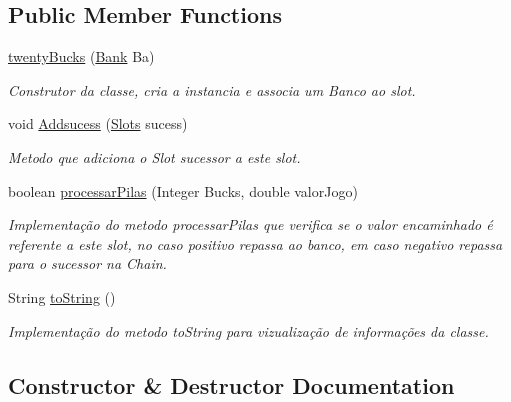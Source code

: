 \subsection*{Public Member Functions}
\begin{DoxyCompactItemize}
\item 
\mbox{\hyperlink{classchain_of_responsability_pattern_1_1twenty_bucks_a50bf28592840faeec411d4691fea5e12}{twenty\+Bucks}} (\mbox{\hyperlink{classmediator_pattern_1_1_bank}{Bank}} Ba)
\begin{DoxyCompactList}\small\item\em Construtor da classe, cria a instancia e associa um Banco ao slot. \end{DoxyCompactList}\item 
void \mbox{\hyperlink{classchain_of_responsability_pattern_1_1twenty_bucks_a70ca8917e318c74341ab19774dd265b3}{Addsucess}} (\mbox{\hyperlink{interfacechain_of_responsability_pattern_1_1_slots}{Slots}} sucess)
\begin{DoxyCompactList}\small\item\em Metodo que adiciona o Slot sucessor a este slot. \end{DoxyCompactList}\item 
boolean \mbox{\hyperlink{classchain_of_responsability_pattern_1_1twenty_bucks_aa8536487b98149e0c022258bb255a3b1}{processar\+Pilas}} (Integer Bucks, double valor\+Jogo)
\begin{DoxyCompactList}\small\item\em Implementação do metodo processar\+Pilas que verifica se o valor encaminhado é referente a este slot, no caso positivo repassa ao banco, em caso negativo repassa para o sucessor na Chain. \end{DoxyCompactList}\item 
String \mbox{\hyperlink{classchain_of_responsability_pattern_1_1twenty_bucks_aabe3736a8831bab766e179c4b38b4c4c}{to\+String}} ()
\begin{DoxyCompactList}\small\item\em Implementação do metodo to\+String para vizualização de informações da classe. \end{DoxyCompactList}\end{DoxyCompactItemize}


\subsection{Constructor \& Destructor Documentation}
\mbox{\label{classchain_of_responsability_pattern_1_1twenty_bucks_a50bf28592840faeec411d4691fea5e12}} 
